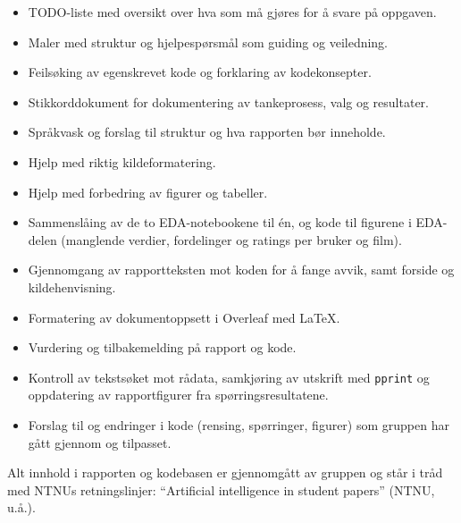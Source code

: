 \documentclass[11pt,a4paper]{article}
\begin{document}
\begin{itemize}
  \item TODO-liste med oversikt over hva som må gjøres for å svare på oppgaven.
  \item Maler med struktur og hjelpespørsmål som guiding og veiledning.
  \item Feilsøking av egenskrevet kode og forklaring av kodekonsepter.
  \item Stikkorddokument for dokumentering av tankeprosess, valg og resultater.
  \item Språkvask og forslag til struktur og hva rapporten bør inneholde.
  \item Hjelp med riktig kildeformatering.
  \item Hjelp med forbedring av figurer og tabeller.
  \item Sammenslåing av de to EDA-notebookene til én, og kode til figurene i EDA-delen (manglende verdier, fordelinger og ratings per bruker og film).
  \item Gjennomgang av rapportteksten mot koden for å fange avvik, samt forside og kildehenvisning.
  \item Formatering av dokumentoppsett i Overleaf med LaTeX.
  \item Vurdering og tilbakemelding på rapport og kode.
  \item Kontroll av tekstsøket mot rådata, samkjøring av utskrift med \texttt{pprint} og oppdatering av rapportfigurer fra spørringsresultatene.
  \item Forslag til og endringer i kode (rensing, spørringer, figurer) som
        gruppen har gått gjennom og tilpasset.
\end{itemize}

Alt innhold i rapporten og kodebasen er gjennomgått av gruppen og står i
tråd med NTNUs retningslinjer: \enquote{Artificial intelligence in student
papers} (NTNU, u.å.).

\end{document}
